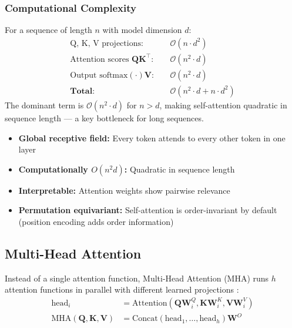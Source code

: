 \subsubsection{Computational Complexity}

For a sequence of length $n$ with model dimension $d$:
\begin{align}
\text{Q, K, V projections:} \quad &\mathcal{O}(n \cdot d^2) \\
\text{Attention scores } \mathbf{Q}\mathbf{K}^\top: \quad &\mathcal{O}(n^2 \cdot d) \\
\text{Output } \text{softmax}(\cdot)\mathbf{V}: \quad &\mathcal{O}(n^2 \cdot d) \\
\textbf{Total:} \quad &\mathcal{O}(n^2 \cdot d + n \cdot d^2)
\end{align}
The dominant term is $\mathcal{O}(n^2 \cdot d)$ for $n > d$, making self-attention quadratic in sequence length --- a key bottleneck for long sequences.

\begin{properties}
\begin{itemize}
    \item \textbf{Global receptive field:} Every token attends to every other token in one layer
    \item \textbf{Computationally $O(n^2 d)$:} Quadratic in sequence length
    \item \textbf{Interpretable:} Attention weights show pairwise relevance
    \item \textbf{Permutation equivariant:} Self-attention is order-invariant by default (position encoding adds order information)
\end{itemize}
\end{properties}

\subsection{Multi-Head Attention}

Instead of a single attention function, Multi-Head Attention (MHA) runs $h$ attention functions in parallel with different learned projections \cite{vaswani2017attention}:
\begin{align}
\text{head}_i &= \text{Attention}(\mathbf{Q}\mathbf{W}_i^Q, \mathbf{K}\mathbf{W}_i^K, \mathbf{V}\mathbf{W}_i^V) \\
\text{MHA}(\mathbf{Q}, \mathbf{K}, \mathbf{V}) &= \text{Concat}(\text{head}_1, \ldots, \text{head}_h)\mathbf{W}^O
\end{align}

